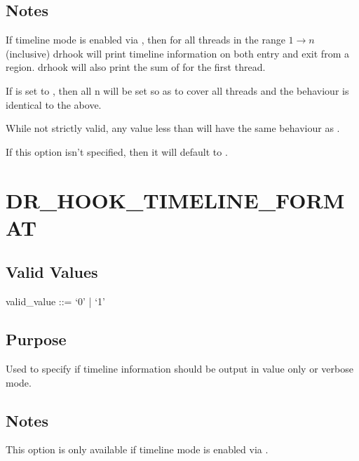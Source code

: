 \documentclass[letterpaper,10pt,english]{sphinxmanual}
\begin{document}
\subsection{Notes}
\label{\detokenize{flag/flag:id99}}
\sphinxAtStartPar
If timeline mode is enabled via {\hyperref[\detokenize{flag/flag:dr-hook-timeline}]{}}, then for all threads in the range \(1 \rightarrow n\) (inclusive) drhook will print timeline information on both entry and exit from a region. drhook will also print the sum of  for the first thread.

\sphinxAtStartPar
If  is set to , then all n will be set so as to cover all threads and the behaviour is identical to the above.

\sphinxAtStartPar
While not strictly valid, any value less than  will have the same behaviour as .

\sphinxAtStartPar
If this option isn’t specified, then it will default to .


\section{DR\_HOOK\_TIMELINE\_FORMAT}
\label{\detokenize{flag/flag:dr-hook-timeline-format}}\label{\detokenize{flag/flag:id102}}

\subsection{Valid Values}
\label{\detokenize{flag/flag:id103}}
\begin{DUlineblock}{0em}
\item[] valid\_value ::= ‘0’ | ‘1’
\end{DUlineblock}


\subsection{Purpose}
\label{\detokenize{flag/flag:id104}}
\sphinxAtStartPar
Used to specify if timeline information should be output in value only or verbose mode.


\subsection{Notes}
\label{\detokenize{flag/flag:id105}}
\sphinxAtStartPar
This option is only available if timeline mode is enabled via {\hyperref[\detokenize{flag/flag:dr-hook-timeline}]{}}.
\end{document}
